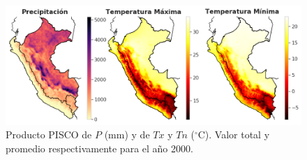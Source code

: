 \vspace{1cm} %
\begin{figure}[ht]
	\includegraphics[width=16cm]{Images/00_PISCOproducts.png}
	\centering
	\caption{Producto PISCO de $P$ (mm) y de $Tx$ y $Tn$ ($^{\circ}$C). Valor total y promedio respectivamente para el año 2000.}
	\label{fig:00_PISCOproducts}
\end{figure}